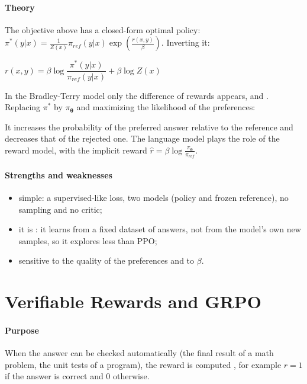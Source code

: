 \paragraph{Theory}
The objective above has a closed-form optimal policy:
$\pi^{*}(y|x)=\frac{1}{Z(x)}\pi_{ref}(y|x)\exp\left(\frac{r(x,y)}{\beta}\right)$.
Inverting it:
\begin{center}
    $r(x,y)=\beta\log\dfrac{\pi^{*}(y|x)}{\pi_{ref}(y|x)}+\beta\log Z(x)$
\end{center}
In the Bradley-Terry model only the difference of rewards appears, and . Replacing $\pi^{*}$ by $\pi_{\bm{\theta}}$ and maximizing the likelihood of the
preferences:
\begin{center}
\end{center}
It increases the probability of the preferred answer relative to the reference and
decreases that of the rejected one. The language model plays the role of the reward model,
with the implicit reward $\hat{r}=\beta\log\frac{\pi_{\bm{\theta}}}{\pi_{ref}}$.

\paragraph{Strengths and weaknesses}
\begin{itemize}
    \item simple: a supervised-like loss, two models (policy and frozen reference), no
        sampling and no critic;
    \item it is : it learns from a fixed dataset of answers, not from the
        model's own new samples, so it explores less than PPO;
    \item sensitive to the quality of the preferences and to $\beta$.
\end{itemize}

\section{Verifiable Rewards and GRPO}
\paragraph{Purpose}
When the answer can be checked automatically (the final result of a math problem, the unit
tests of a program), the reward is computed , for example
$r=1$ if the answer is correct and $0$ otherwise.

